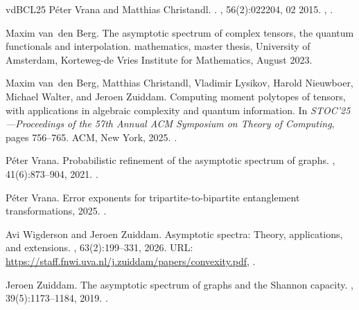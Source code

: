 \documentclass[11pt,letterpaper]{article}
\begin{document}
\begin{thebibliography}{vdBCL{\etalchar{+}}25}
Péter Vrana and Matthias Christandl.
.
, 56(2):022204, 02 2015.
\newblock \href {https://arxiv.org/abs/1310.3244} {},
  \href {https://doi.org/10.1063/1.4908106} {}.

Maxim van~den Berg.
\newblock The asymptotic spectrum of complex tensors, the quantum functionals
  and interpolation.
 mathematics, master thesis, University of Amsterdam,
  Korteweg-de Vries Institute for Mathematics, August 2023.

Maxim van~den Berg, Matthias Christandl, Vladimir Lysikov, Harold Nieuwboer,
  Michael Walter, and Jeroen Zuiddam.
\newblock Computing moment polytopes of tensors, with applications in algebraic
  complexity and quantum information.
\newblock In {\em S{TOC}'25---{P}roceedings of the 57th {A}nnual {ACM}
  {S}ymposium on {T}heory of {C}omputing}, pages 756--765. ACM, New York, 2025.
\newblock \href {https://doi.org/10.1145/3717823.3718221}
  {}.

P\'{e}ter Vrana.
\newblock Probabilistic refinement of the asymptotic spectrum of graphs.
, 41(6):873--904, 2021.
\newblock \href {https://doi.org/10.1007/s00493-020-4324-5}
  {}.

Péter Vrana.
\newblock Error exponents for tripartite-to-bipartite entanglement
  transformations, 2025.
\newblock \href {https://arxiv.org/abs/2507.13778} {}.

Avi Wigderson and Jeroen Zuiddam.
\newblock Asymptotic spectra: Theory, applications, and extensions.
, 63(2):199--331, 2026.
\newblock URL: \url{https://staff.fnwi.uva.nl/j.zuiddam/papers/convexity.pdf},
  \href {https://doi.org/10.1090/bull/1880} {}.

Jeroen Zuiddam.
\newblock The asymptotic spectrum of graphs and the {S}hannon capacity.
, 39(5):1173--1184, 2019.
\newblock \href {https://doi.org/10.1007/s00493-019-3992-5}
  {}.

\end{thebibliography}
\end{document}
